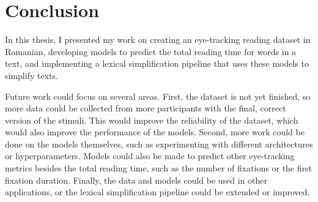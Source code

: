 \chapter{Conclusion}
In this thesis, I presented my work on creating an eye-tracking reading dataset in Romanian, developing models to predict the total reading time for words in a text, and implementing a lexical simplification pipeline that uses these models to simplify texts.

Future work could focus on several areas. First, the dataset is not yet finished, so more data could be collected from more participants with the final, correct version of the stimuli. This would improve the reliability of the dataset, which would also improve the performance of the models. Second, more work could be done on the models themselves, such as experimenting with different architectures or hyperparameters. Models could also be made to predict other eye-tracking metrics besides the total reading time, such as the number of fixations or the first fixation duration. Finally, the data and models could be used in other applications, or the lexical simplification pipeline could be extended or improved.